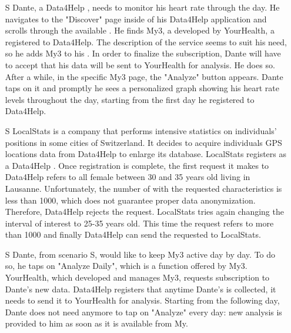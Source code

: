 \documentclass[../../rasd.tex]{subfiles}
\begin{document}
\begin{itemize}
                    \item[S\subs{3}] Dante, a Data4Help , needs to monitor his heart rate through the day. He navigates to the "Discover" page inside of his Data4Help application and scrolls through the available . He finds My3, a  developed by YourHealth, a  registered to Data4Help. The description of the service seems to suit his need, so he adds My3 to his . In order to finalize the subscription, Dante will have to accept that his data will be sent to YourHealth for analysis. He does so. After a while, in the specific My3  page, the "Analyze" button appears. Dante taps on it and promptly he sees a personalized graph showing his heart rate levels throughout the day, starting from the first day he registered to Data4Help.

                    \item[S\subs{4}] LocalStats is a company that performs intensive statistics on individuals' positions in some cities of Switzerland. It decides to acquire individuals GPS locations data from Data4Help to enlarge its database. LocalStats registers as a Data4Help . Once registration is complete, the first request it makes to Data4Help refers to all female  between 30 and 35 years old living in Lausanne. Unfortunately, the number of  with the requested characteristics is less than 1000, which does not guarantee proper data anonymization. Therefore, Data4Help rejects the  request. LocalStats tries again changing the interval of interest to 25-35 years old. This time the request refers to more than 1000  and finally Data4Help can send the requested  to LocalStats.

                    \item[S\subs{5}] Dante, from scenario S, would like to keep My3 active day by day. To do so, he taps on "Analyze Daily", which is a function offered by My3. YourHealth, which developed and manages My3, requests subscription to Dante's new data. Data4Help registers that anytime Dante's  is collected, it needs to send it to YourHealth for analysis. Starting from the following day, Dante does not need anymore to tap on "Analyze" every day: new analysis is provided to him as soon as it is available from My.


\end{itemize}
\end{document}
